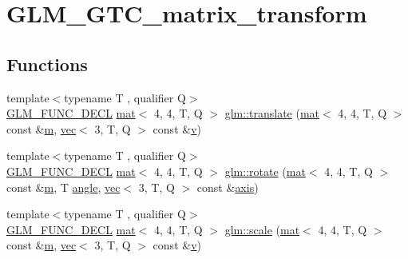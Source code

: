 \hypertarget{group__gtc__matrix__transform}{}\section{G\+L\+M\+\_\+\+G\+T\+C\+\_\+matrix\+\_\+transform}
\label{group__gtc__matrix__transform}
\subsection*{Functions}
\begin{DoxyCompactItemize}
\item 
{\footnotesize template$<$typename T , qualifier Q$>$ }\\\hyperlink{setup_8hpp_ab2d052de21a70539923e9bcbf6e83a51}{G\+L\+M\+\_\+\+F\+U\+N\+C\+\_\+\+D\+E\+CL} \hyperlink{structglm_1_1mat}{mat}$<$ 4, 4, T, Q $>$ \hyperlink{group__gtc__matrix__transform_ga1a4ecc4ad82652b8fb14dcb087879284}{glm\+::translate} (\hyperlink{structglm_1_1mat}{mat}$<$ 4, 4, T, Q $>$ const \&\hyperlink{_s_d_l__opengl__glext_8h_af593500c283bf1a787a6f947f503a5c2}{m}, \hyperlink{structglm_1_1vec}{vec}$<$ 3, T, Q $>$ const \&\hyperlink{_s_d_l__opengl_8h_a10a82eabcb59d2fcd74acee063775f90}{v})
\item 
{\footnotesize template$<$typename T , qualifier Q$>$ }\\\hyperlink{setup_8hpp_ab2d052de21a70539923e9bcbf6e83a51}{G\+L\+M\+\_\+\+F\+U\+N\+C\+\_\+\+D\+E\+CL} \hyperlink{structglm_1_1mat}{mat}$<$ 4, 4, T, Q $>$ \hyperlink{group__gtc__matrix__transform_gaee9e865eaa9776370996da2940873fd4}{glm\+::rotate} (\hyperlink{structglm_1_1mat}{mat}$<$ 4, 4, T, Q $>$ const \&\hyperlink{_s_d_l__opengl__glext_8h_af593500c283bf1a787a6f947f503a5c2}{m}, T \hyperlink{_s_d_l__opengl__glext_8h_a9e06c1f76a20fed54ca742cd25cb02c4}{angle}, \hyperlink{structglm_1_1vec}{vec}$<$ 3, T, Q $>$ const \&\hyperlink{group__gtc__quaternion_gaaf2707d3081789ce097daaa6e54d5287}{axis})
\item 
{\footnotesize template$<$typename T , qualifier Q$>$ }\\\hyperlink{setup_8hpp_ab2d052de21a70539923e9bcbf6e83a51}{G\+L\+M\+\_\+\+F\+U\+N\+C\+\_\+\+D\+E\+CL} \hyperlink{structglm_1_1mat}{mat}$<$ 4, 4, T, Q $>$ \hyperlink{group__gtc__matrix__transform_ga05051adbee603fb3c5095d8cf5cc229b}{glm\+::scale} (\hyperlink{structglm_1_1mat}{mat}$<$ 4, 4, T, Q $>$ const \&\hyperlink{_s_d_l__opengl__glext_8h_af593500c283bf1a787a6f947f503a5c2}{m}, \hyperlink{structglm_1_1vec}{vec}$<$ 3, T, Q $>$ const \&\hyperlink{_s_d_l__opengl_8h_a10a82eabcb59d2fcd74acee063775f90}{v})

\end{DoxyCompactItemize}
